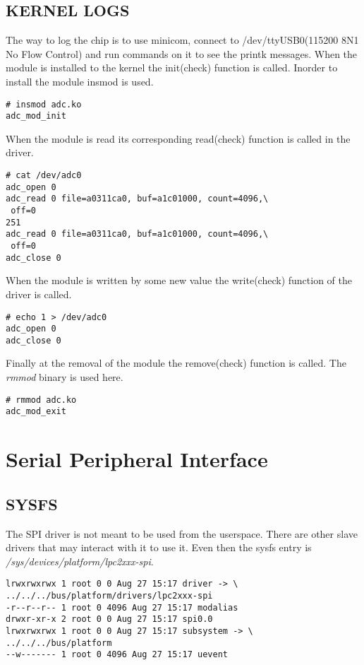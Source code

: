 \documentclass{book}
\begin{document}
\section{KERNEL LOGS}
The way to log the chip is to use minicom, connect to /dev/ttyUSB0(115200 8N1 No Flow Control) and run commands on it to see the printk messages. When the module is installed to the kernel the init(check) function is called. Inorder to install the module insmod is used.
\begin{Verbatim}[fontsize=\footnotesize]
# insmod adc.ko 
adc_mod_init
\end{Verbatim}
When the module is read its corresponding read(check) function is called in the driver.
\begin{Verbatim}[fontsize=\footnotesize]
# cat /dev/adc0 
adc_open 0 
adc_read 0 file=a0311ca0, buf=a1c01000, count=4096,\
 off=0 
251 
adc_read 0 file=a0311ca0, buf=a1c01000, count=4096,\
 off=0
adc_close 0 
\end{Verbatim}
When the module is written by some new value the write(check) function of the driver is called. 
\begin{Verbatim}[fontsize=\footnotesize]
# echo 1 > /dev/adc0 
adc_open 0 
adc_close 0 
\end{Verbatim}
Finally at the removal of the module the remove(check) function is called. The \textit{rmmod} binary is used here.
\begin{Verbatim}[fontsize=\footnotesize]
# rmmod adc.ko 
adc_mod_exit 
\end{Verbatim}




\chapter{Serial Peripheral Interface}
\section{SYSFS}
The SPI driver is not meant to be used from the userspace. There are other slave drivers that may interact with it to use it. Even then the sysfs entry is \textit{/sys/devices/platform/lpc2xxx-spi}.
\begin{Verbatim}[fontsize=\footnotesize]
lrwxrwxrwx 1 root 0 0 Aug 27 15:17 driver -> \
../../../bus/platform/drivers/lpc2xxx-spi
-r--r--r-- 1 root 0 4096 Aug 27 15:17 modalias 
drwxr-xr-x 2 root 0 0 Aug 27 15:17 spi0.0 
lrwxrwxrwx 1 root 0 0 Aug 27 15:17 subsystem -> \
../../../bus/platform 
--w------- 1 root 0 4096 Aug 27 15:17 uevent 
\end{Verbatim}
\end{document}
